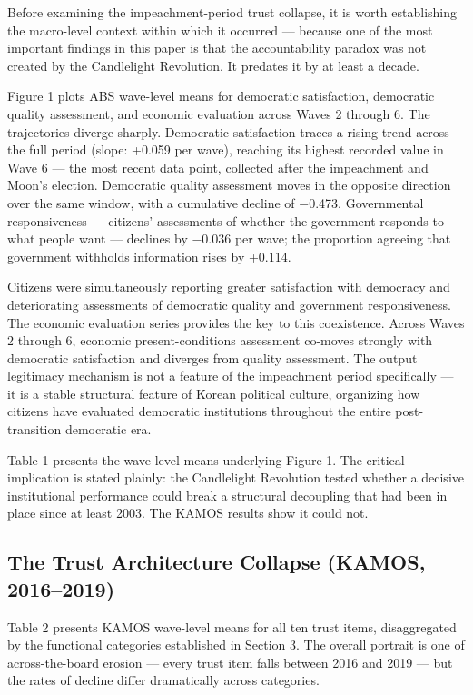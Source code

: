 \documentclass[
  12pt,
  letterpaper]{article}
\begin{document}
Before examining the impeachment-period trust collapse, it is worth
establishing the macro-level context within which it occurred ---
because one of the most important findings in this paper is that the
accountability paradox was not created by the Candlelight Revolution. It
predates it by at least a decade.

Figure 1 plots ABS wave-level means for democratic satisfaction,
democratic quality assessment, and economic evaluation across Waves 2
through 6. The trajectories diverge sharply. Democratic satisfaction
traces a rising trend across the full period (slope: +0.059 per wave),
reaching its highest recorded value in Wave 6 --- the most recent data
point, collected after the impeachment and Moon's election. Democratic
quality assessment moves in the opposite direction over the same window,
with a cumulative decline of −0.473. Governmental responsiveness ---
citizens' assessments of whether the government responds to what people
want --- declines by −0.036 per wave; the proportion agreeing that
government withholds information rises by +0.114.

Citizens were simultaneously reporting greater satisfaction with
democracy and deteriorating assessments of democratic quality and
government responsiveness. The economic evaluation series provides the
key to this coexistence. Across Waves 2 through 6, economic
present-conditions assessment co-moves strongly with democratic
satisfaction and diverges from quality assessment. The output legitimacy
mechanism is not a feature of the impeachment period specifically --- it
is a stable structural feature of Korean political culture, organizing
how citizens have evaluated democratic institutions throughout the
entire post-transition democratic era.

Table 1 presents the wave-level means underlying Figure 1. The critical
implication is stated plainly: the Candlelight Revolution tested whether
a decisive institutional performance could break a structural decoupling
that had been in place since at least 2003. The KAMOS results show it
could not.

\subsection{The Trust Architecture Collapse (KAMOS,
2016--2019)}\label{the-trust-architecture-collapse-kamos-20162019}

Table 2 presents KAMOS wave-level means for all ten trust items,
disaggregated by the functional categories established in Section 3. The
overall portrait is one of across-the-board erosion --- every trust item
falls between 2016 and 2019 --- but the rates of decline differ
dramatically across categories.
\end{document}

